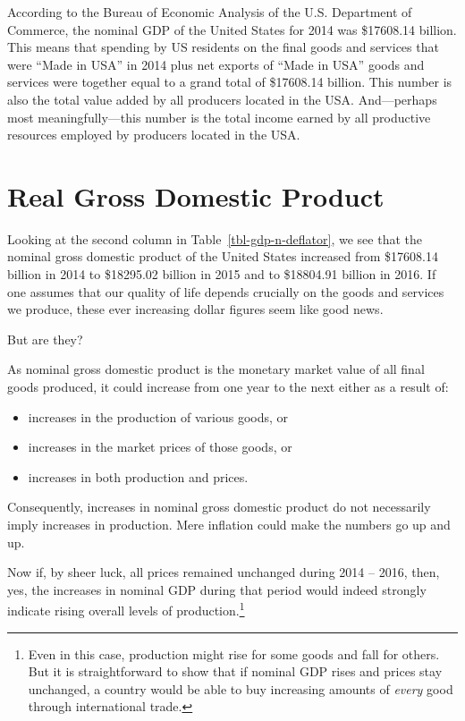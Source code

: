 \documentclass[
  letterpaper,
]{book}
\providecommand{\tightlist}{%
  \setlength{\itemsep}{0pt}\setlength{\parskip}{0pt}}\usepackage{longtable,booktabs,array}
\theoremstyle{plain}
\theoremstyle{remark}
\begin{document}
According to the Bureau of Economic Analysis of the U.S. Department of
Commerce, the nominal GDP of the United States for 2014 was \$17608.14
billion. This means that spending by US residents on the final goods and
services that were ``Made in USA'' in 2014 plus net exports of ``Made in
USA'' goods and services were together equal to a grand total of
\$17608.14 billion. This number is also the total value added by all
producers located in the USA. And---perhaps most meaningfully---this
number is the total income earned by all productive resources employed
by producers located in the USA.

\section{Real Gross Domestic Product}\label{sec-rGDP}


Looking at the second column in Table~\ref{tbl-gdp-n-deflator}, we see
that the nominal gross domestic product of the United States increased
from \$17608.14 billion in 2014 to \$18295.02 billion in 2015 and to
\$18804.91 billion in 2016. If one assumes that our quality of life
depends crucially on the goods and services we produce, these ever
increasing dollar figures seem like good news.

But are they?

As nominal gross domestic product is the monetary market value of all
final goods produced, it could increase from one year to the next either
as a result of:

\begin{itemize}
\tightlist
\item
  increases in the production of various goods, or
\item
  increases in the market prices of those goods, or
\item
  increases in both production and prices.
\end{itemize}

Consequently, increases in nominal gross domestic product do not
necessarily imply increases in production. Mere inflation could make the
numbers go up and up.

Now if, by sheer luck, all prices remained unchanged during 2014 --
2016, then, yes, the increases in nominal GDP during that period would
indeed strongly indicate rising overall levels of production.\footnote{Even
  in this case, production might rise for some goods and fall for
  others. But it is straightforward to show that if nominal GDP rises
  and prices stay unchanged, a country would be able to buy increasing
  amounts of \emph{every} good through international trade.}
\end{document}

